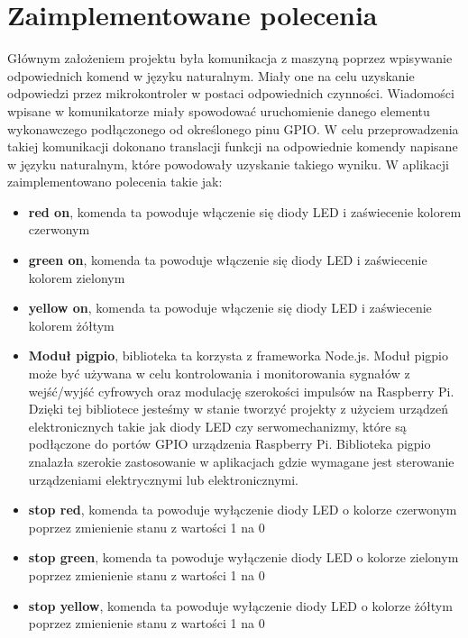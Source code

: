 \section{Zaimplementowane polecenia}
Głównym założeniem projektu była komunikacja z maszyną poprzez wpisywanie odpowiednich komend w języku naturalnym. Miały one na celu uzyskanie odpowiedzi przez mikrokontroler w postaci odpowiednich czynności. Wiadomości wpisane w komunikatorze miały spowodować uruchomienie danego elementu wykonawczego podłączonego od określonego pinu GPIO. W celu przeprowadzenia takiej komunikacji dokonano translacji funkcji na odpowiednie komendy napisane w języku naturalnym, które powodowały uzyskanie takiego wyniku. W aplikacji zaimplementowano polecenia takie jak:
\begin{itemize}  
	\item \textbf{red on}, komenda ta powoduje włączenie się diody LED i zaświecenie kolorem czerwonym
	\\
	\item \textbf{green on}, komenda ta powoduje włączenie się diody LED i zaświecenie kolorem zielonym
	\\
\item \textbf{yellow on}, komenda ta powoduje włączenie się diody LED i zaświecenie kolorem żółtym
	\\
	\item \textbf{Moduł pigpio}, biblioteka ta korzysta z frameworka Node.js. Moduł pigpio może być używana w celu kontrolowania i monitorowania sygnałów z wejść/wyjść cyfrowych oraz modulację szerokości impulsów na Raspberry Pi. Dzięki tej bibliotece jesteśmy w stanie tworzyć projekty z użyciem urządzeń elektronicznych takie jak diody LED czy serwomechanizmy, które są podłączone do portów GPIO urządzenia Raspberry Pi. Biblioteka pigpio znalazła szerokie zastosowanie w aplikacjach gdzie wymagane jest sterowanie urządzeniami elektrycznymi lub elektronicznymi.
	\\
\item \textbf{stop red}, komenda ta powoduje wyłączenie diody LED o kolorze czerwonym poprzez zmienienie stanu z wartości 1 na 0
	\\
	\item \textbf{stop green}, komenda ta powoduje wyłączenie diody LED o kolorze zielonym poprzez zmienienie stanu z wartości 1 na 0
	\\
\item \textbf{stop yellow}, komenda ta powoduje wyłączenie diody LED o kolorze żółtym poprzez zmienienie stanu z wartości 1 na 0

\end{itemize}
